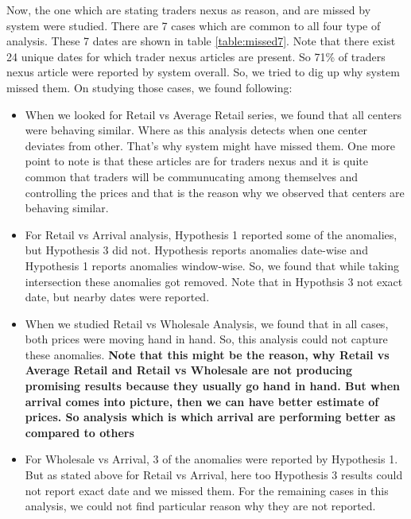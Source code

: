 \documentclass[a4paper,10pt]{article}
\begin{document}
Now, the one which are stating traders nexus as reason, and are missed by system were studied. There are 7 cases which are common to all four type of analysis. These 7 dates are shown in table \ref{table:missed7}. Note that there exist 24 unique dates for which trader nexus articles are present. So 71\% of traders nexus article were reported by system overall. So, we tried to dig up why system missed them. On studying those cases, we found following:

\begin{itemize}

	\item When we looked for Retail vs Average Retail series, we found that all centers were behaving similar. Where as this analysis detects when one center deviates from other. That's why system might have missed them. One more point to note is that these articles are for traders nexus and it is quite common that traders will be communucating among themselves and controlling the prices and that is the reason why we observed that centers are behaving similar.
	
	\item For Retail vs Arrival analysis, Hypothesis 1 reported some of the anomalies, but Hypothesis 3 did not. Hypothesis reports anomalies date-wise and Hypothesis 1 reports anomalies window-wise. So, we found that while taking intersection these anomalies got removed. Note that in Hypothsis 3 not exact date, but nearby dates were reported.
	
	\item When we studied Retail vs Wholesale Analysis, we found that in all cases, both prices were moving hand in hand. So, this analysis could not capture these anomalies. \textbf{ Note that this might be the reason, why Retail vs Average Retail and Retail vs Wholesale are not producing promising results because they usually go hand in hand. But when arrival comes into picture, then we can have better estimate of prices. So analysis which is which arrival are performing better as compared to others}
	
	\item For Wholesale vs Arrival, 3 of the anomalies were reported by Hypothesis 1. But as stated above for Retail vs Arrival, here too Hypothesis 3 results could not report exact date and we missed them. For the remaining cases in this analysis, we could not find particular reason why they are not reported.
	
\end{itemize}
\end{document}
